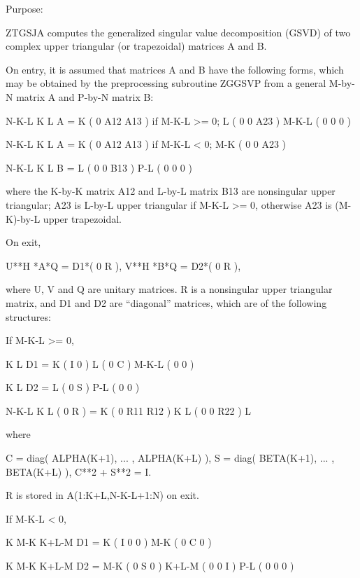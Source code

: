  \begin{DoxyParagraph}{Purpose\+: }
\begin{DoxyVerb} ZTGSJA computes the generalized singular value decomposition (GSVD)
 of two complex upper triangular (or trapezoidal) matrices A and B.

 On entry, it is assumed that matrices A and B have the following
 forms, which may be obtained by the preprocessing subroutine ZGGSVP
 from a general M-by-N matrix A and P-by-N matrix B:

              N-K-L  K    L
    A =    K ( 0    A12  A13 ) if M-K-L >= 0;
           L ( 0     0   A23 )
       M-K-L ( 0     0    0  )

            N-K-L  K    L
    A =  K ( 0    A12  A13 ) if M-K-L < 0;
       M-K ( 0     0   A23 )

            N-K-L  K    L
    B =  L ( 0     0   B13 )
       P-L ( 0     0    0  )

 where the K-by-K matrix A12 and L-by-L matrix B13 are nonsingular
 upper triangular; A23 is L-by-L upper triangular if M-K-L >= 0,
 otherwise A23 is (M-K)-by-L upper trapezoidal.

 On exit,

        U**H *A*Q = D1*( 0 R ),    V**H *B*Q = D2*( 0 R ),

 where U, V and Q are unitary matrices.
 R is a nonsingular upper triangular matrix, and D1
 and D2 are ``diagonal'' matrices, which are of the following
 structures:

 If M-K-L >= 0,

                     K  L
        D1 =     K ( I  0 )
                 L ( 0  C )
             M-K-L ( 0  0 )

                    K  L
        D2 = L   ( 0  S )
             P-L ( 0  0 )

                N-K-L  K    L
   ( 0 R ) = K (  0   R11  R12 ) K
             L (  0    0   R22 ) L

 where

   C = diag( ALPHA(K+1), ... , ALPHA(K+L) ),
   S = diag( BETA(K+1),  ... , BETA(K+L) ),
   C**2 + S**2 = I.

   R is stored in A(1:K+L,N-K-L+1:N) on exit.

 If M-K-L < 0,

                K M-K K+L-M
     D1 =   K ( I  0    0   )
          M-K ( 0  C    0   )

                  K M-K K+L-M
     D2 =   M-K ( 0  S    0   )
          K+L-M ( 0  0    I   )
            P-L ( 0  0    0   )


\end{DoxyVerb}
\end{DoxyParagraph}
